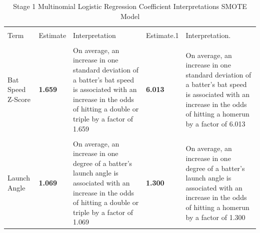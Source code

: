 \documentclass[
  letterpaper,
  DIV=11,
  numbers=noendperiod]{scrartcl}
\begin{document}
\begin{table}[!h]
\centering
\caption{\label{tab:unnamed-chunk-44}Stage 1 Multinomial Logistic Regression Coefficient Interpretations SMOTE Model}
\centering
\fontsize{10}{12}\selectfont
\begin{tabular}[t]{>{\raggedright\arraybackslash}p{3cm}>{\raggedright\arraybackslash}p{2cm}>{\raggedright\arraybackslash}p{4cm}>{\raggedright\arraybackslash}p{2cm}>{\raggedright\arraybackslash}p{4cm}}
\toprule
\multicolumn{1}{c}{ } & \multicolumn{2}{c}{Double/Triple} & \multicolumn{2}{c}{Homerun} \\
\cmidrule(l{3pt}r{3pt}){2-3} \cmidrule(l{3pt}r{3pt}){4-5}
Term & Estimate & Interpretation & Estimate.1 & Interpretation.\\
\midrule
\cellcolor{gray!10}{Swing Length Z-Score} & \textbf{\cellcolor{gray!10}{1.177}} & \cellcolor{gray!10}{On average, an increase in one standard deviation of a batter's swing length is associated with an increase in the odds of hitting a double or triple by a factor of 1.177.} & \textbf{\cellcolor{gray!10}{1.522}} & \cellcolor{gray!10}{On average, an increase in one standard deviation of a batter's swing length is associated with an increase in the odds of hitting a homerun by a factor of 1.522}\\
Bat Speed Z-Score & \textbf{1.659} & On average, an increase in one standard deviation of a batter's bat speed is associated with an increase in the odds of hitting a double or triple by a factor of 1.659 & \textbf{6.013} & On average, an increase in one standard deviation of a batter's bat speed is associated with an increase in the odds of hitting a homerun by a factor of 6.013\\
\cellcolor{gray!10}{Release Speed Z-Score} & \cellcolor{gray!10}{0.99} & \cellcolor{gray!10}{On average, an increase in one standard deviation of a pitcher's release speed is associated with an decrease in the odds of hitting a double or triple by a factor of 0.99} & \textbf{\cellcolor{gray!10}{1.092}} & \cellcolor{gray!10}{On average, an increase in one standard deviation of a pitcher's release speed is associated with an increase in the odds of hitting a homerun by a factor of 1.092}\\
Launch Angle & \textbf{1.069} & On average, an increase in one degree of a batter's launch angle is associated with an increase in the odds of hitting a double or triple by a factor of 1.069 & \textbf{1.300} & On average, an increase in one degree of a batter's launch angle is associated with an increase in the odds of hitting a homerun by a factor of 1.300\\

\end{tabular}
\end{table}
\end{document}
